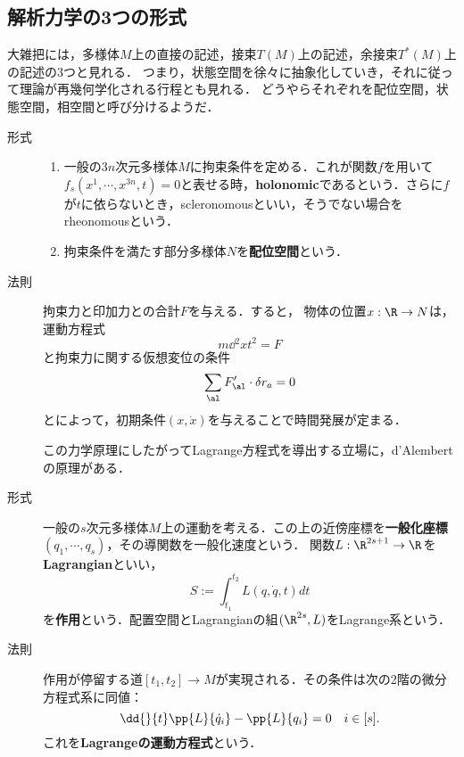 \documentclass[uplatex,dvipdfmx]{jsreport}
\begin{document}
\subsection{解析力学の3つの形式}

\begin{tcolorbox}[colframe=ForestGreen, colback=ForestGreen!10!white,breakable,colbacktitle=ForestGreen!40!white,coltitle=black,fonttitle=\bfseries\sffamily,
title=]
    大雑把には，多様体$M$上の直接の記述，接束$T(M)$上の記述，余接束$T^*(M)$上の記述の3つと見れる．
    つまり，状態空間を徐々に抽象化していき，それに従って理論が再幾何学化される行程とも見れる．
    どうやらそれぞれを配位空間，状態空間，相空間と呼び分けるようだ．
\end{tcolorbox}

\begin{model}\mbox{}
    \begin{description}
        \item[形式] \begin{enumerate}
            \item 一般の$3n$次元多様体$M$に拘束条件を定める．これが関数$f$を用いて$f_s(x^1,\cdots,x^{3n},t)=0$と表せる時，\textbf{holonomic}であるという．さらに$f$が$t$に依らないとき，scleronomousといい，そうでない場合をrheonomousという．
            \item 拘束条件を満たす部分多様体$N$を\textbf{配位空間}という．
        \end{enumerate}
        \item[法則] 拘束力と印加力との合計$F$を与える．すると，
        物体の位置$x:\R\to N$は，運動方程式
        \[m\dd{^2x}{t^2}=F\]
        と拘束力に関する仮想変位の条件
        \[\sum_\al F_\al'\cdot\delta r_a=0\]
        とによって，初期条件$(x,\dot{x})$を与えることで時間発展が定まる．

        この力学原理にしたがってLagrange方程式を導出する立場に，d'Alembertの原理がある．
    \end{description}
\end{model}

\begin{model}[Lagrange形式]\mbox{}
    \begin{description}
        \item[形式] 一般の$s$次元多様体$M$上の運動を考える．この上の近傍座標を\textbf{一般化座標}$(q_1,\cdots,q_s)$，その導関数を一般化速度という．
        関数$L:\R^{2s+1}\to\R$を\textbf{Lagrangian}といい，
        \[S:=\int^{t_2}_{t_1}L(q,\dot{q},t)dt\]
        を\textbf{作用}という．配置空間とLagrangianの組$(\R^{2s},L)$をLagrange系という．
        \item[法則] 作用が停留する道$[t_1,t_2]\to M$が実現される．その条件は次の2階の微分方程式系に同値：
        \[\dd{}{t}\pp{L}{\dot{q}_i}-\pp{L}{q_i}=0\quad i\in[s].\]
        これを\textbf{Lagrangeの運動方程式}という．
    \end{description}
\end{model}
\end{document}
